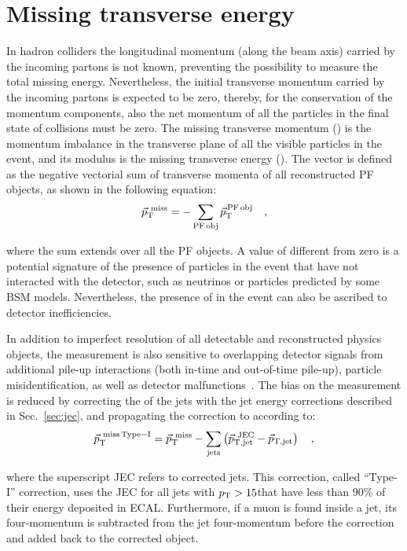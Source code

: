 \section{Missing transverse energy}\label{sec:met}

In hadron colliders the longitudinal momentum (along the beam axis) carried by the incoming partons is not known, preventing the possibility to measure the total missing energy. Nevertheless, the initial transverse momentum carried by the incoming partons is expected to be zero, thereby, for the conservation of the momentum components, also the net momentum of all the particles in the final state of collisions must be zero. The missing transverse momentum (\ptmiss) is the momentum imbalance in the transverse plane of all the visible particles in the event, and its modulus is the missing transverse energy (\MET). The \ptmiss vector is defined as the negative vectorial sum of transverse momenta of all reconstructed PF objects, as shown in the following equation:
\begin{equation}\label{eq:met}
\vec{p}_\mathrm{T}^\mathrm{~miss} = - \sum_{\mathrm{PF\,obj}} \vec{p}_\mathrm{T}^\mathrm{\,PF\,obj} \quad,
\end{equation}

\noindent where the sum extends over all the PF objects.
A value of \MET different from zero is a potential signature of the presence of particles in the event that have not interacted with the detector, such as neutrinos or particles predicted by some BSM models. Nevertheless, the presence of \MET in the event can also be ascribed to detector inefficiencies.

In addition to imperfect resolution of all detectable and reconstructed physics objects, the \MET measurement is also sensitive to overlapping detector signals from additional pile-up interactions (both in-time and out-of-time pile-up), particle misidentification, as well as detector  malfunctions~\cite{CMS-PAS-JME-12-002,CMS-PAS-JME-16-004}.
The bias on the \MET measurement is reduced by correcting the \pt of the jets with the jet energy corrections described in Sec.~\ref{sec:jec}, and propagating the correction to \MET according to:
\begin{equation}
\vec{p}_\mathrm{T}^\mathrm{~miss\,Type-I} = \vec{p}_\mathrm{T}^\mathrm{~miss} - \sum_\mathrm{jets} \left( \vec{p}_\mathrm{T,jet}^\mathrm{~JEC} - \vec{p}_\mathrm{T,jet}  \right) \quad ,
\end{equation}

\noindent where the superscript JEC refers to corrected jets. This correction, called ``Type-I'' correction, uses the JEC for all jets with $p_\mathrm{T}>15$\GeV that have less than 90\% of their energy deposited in ECAL. Furthermore, if a muon is found inside a jet, its four-momentum is subtracted from the jet four-momentum before the correction and added back to the corrected object.

